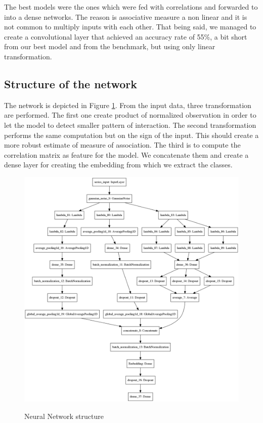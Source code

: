 \documentclass[a4paper,twoside]{article}
\begin{document}
The best models were the ones which were fed with correlations and forwarded
to into a dense networks. The reason is associative measure a non linear and
it is not common to multiply inputs with each other. That being said, we
managed to create a convolutional layer that achieved an accuracy rate of
55\%, a bit short from our best model and from the benchmark, but using only
linear transformation.


\subsection{Structure of the network}
\label{sec:orgf675192}

The network is depicted in Figure \ref{fig:keras-nn}. From the input data,
three transformation are performed. The first one create product of
normalized observation in order to let the model to detect smaller pattern of
interaction. The second transformation performs the same computation but on
the sign of the input. This should create a more robust estimate of measure
of association. The third is to compute the correlation matrix as feature for
the model. We concatenate them and create a dense layer for creating the
embedding from which we extract the classes.


\begin{figure}    
\begin{center}
  \label{fig:keras-nn}
  \includegraphics[width=\textwidth]{./figures/model_keras}
  \caption{Neural Network structure}
  \end{center}
\end{figure}
\end{document}
